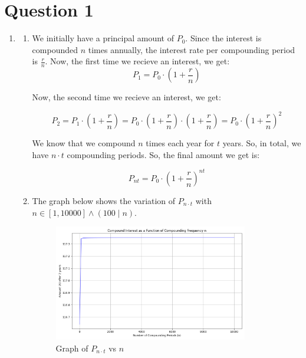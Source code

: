 \documentclass[a4paper]{article}
\begin{document}
\section*{Question 1}
\begin{enumerate}
    \item \begin{enumerate}[label=(\alph*)]
        \item We initially have a principal amount of $P_0$. Since the interest is compounded $n$ times annually, the interest rate per compounding period is $\frac{r}{n}$. Now, the first time we recieve an interest, we get:\\
        
        \[ P_1 = P_0 \cdot (1 + \frac{r}{n}) \]

        Now, the second time we recieve an interest, we get:

        \[ P_2 = P_1 \cdot (1 + \frac{r}{n}) = P_0 \cdot (1 + \frac{r}{n}) \cdot (1 + \frac{r}{n}) = P_0 \cdot (1 + \frac{r}{n})^2 \]

        We know that we compound $n$ times each year for $t$ years. So, in total, we have $n \cdot t$ compounding periods. So, the final amount we get is:

        \[ P_{nt} = P_0 \cdot (1 + \frac{r}{n})^{nt} \]

        \vspace{15mm}

        \item The graph below shows the variation of $P_{n \cdot t}$ with $n \in [1, 10000] \land (100 \mid n)$.
        \begin{figure}[h]
            \centering
            \includegraphics[width=0.85\textwidth]{Q1.png}
            \caption{Graph of $P_{n \cdot t}$ vs $n$}
        \end{figure}

        \vspace{15mm}


\end{enumerate}
\end{enumerate}
\end{document}
